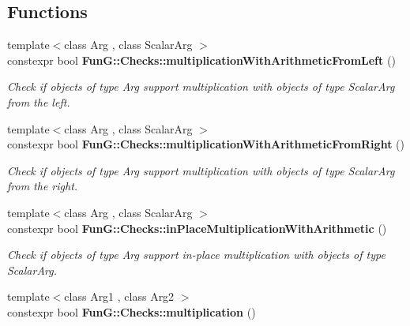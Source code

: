 \subsection*{Functions}
\begin{DoxyCompactItemize}
\item 
\hypertarget{namespaceFunG_1_1Checks_a023e0071a13fe19a14bd71df1a02a290}{{\footnotesize template$<$class Arg , class Scalar\-Arg $>$ }\\constexpr bool {\bfseries Fun\-G\-::\-Checks\-::multiplication\-With\-Arithmetic\-From\-Left} ()}\label{namespaceFunG_1_1Checks_a023e0071a13fe19a14bd71df1a02a290}

\begin{DoxyCompactList}\small\item\em Check if objects of type Arg support multiplication with objects of type Scalar\-Arg from the left. \end{DoxyCompactList}\item 
\hypertarget{namespaceFunG_1_1Checks_a584f795b6dfaffd9657888893afd32f3}{{\footnotesize template$<$class Arg , class Scalar\-Arg $>$ }\\constexpr bool {\bfseries Fun\-G\-::\-Checks\-::multiplication\-With\-Arithmetic\-From\-Right} ()}\label{namespaceFunG_1_1Checks_a584f795b6dfaffd9657888893afd32f3}

\begin{DoxyCompactList}\small\item\em Check if objects of type Arg support multiplication with objects of type Scalar\-Arg from the right. \end{DoxyCompactList}\item 
\hypertarget{namespaceFunG_1_1Checks_a3b91969c5e1b84915c384cee63bdb649}{{\footnotesize template$<$class Arg , class Scalar\-Arg $>$ }\\constexpr bool {\bfseries Fun\-G\-::\-Checks\-::in\-Place\-Multiplication\-With\-Arithmetic} ()}\label{namespaceFunG_1_1Checks_a3b91969c5e1b84915c384cee63bdb649}

\begin{DoxyCompactList}\small\item\em Check if objects of type Arg support in-\/place multiplication with objects of type Scalar\-Arg. \end{DoxyCompactList}\item 
\hypertarget{namespaceFunG_1_1Checks_afc0d2ac0287022a297061359d40073d2}{{\footnotesize template$<$class Arg1 , class Arg2 $>$ }\\constexpr bool {\bfseries Fun\-G\-::\-Checks\-::multiplication} ()}\label{namespaceFunG_1_1Checks_afc0d2ac0287022a297061359d40073d2}


\end{DoxyCompactItemize}
